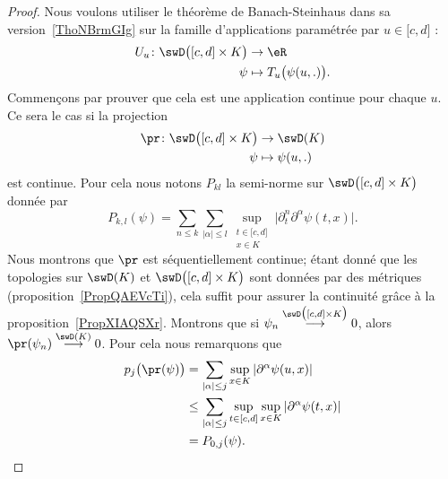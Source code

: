 \begin{proof}
    Nous voulons utiliser le théorème de Banach-Steinhaus dans sa version~\ref{ThoNBrmGIg} sur la famille d'applications paramétrée par \( u\in\mathopen[ c , d \mathclose]\) :
    \begin{equation}        \label{EqBEKoqMb}
        \begin{aligned}
            U_u\colon \swD\big( \mathopen[ c , d \mathclose]\times K \big)&\to \eR \\
            \psi&\mapsto T_u\big( \psi(u,.) \big).
        \end{aligned}
    \end{equation}
    Commençons par prouver que cela est une application continue pour chaque \( u\). Ce sera le cas si la projection
    \begin{equation}
        \begin{aligned}
            \pr\colon \swD\big( \mathopen[ c , d \mathclose]\times K \big)&\to \swD(K) \\
            \psi&\mapsto \psi(u,.)
        \end{aligned}
    \end{equation}
    est continue. Pour cela nous notons \( P_{kl}\) la semi-norme sur \( \swD\big( \mathopen[ c , d \mathclose]\times K \big)\) donnée par
    \begin{equation}
        P_{k,l}(\psi)=\sum_{n\leq k}\sum_{| \alpha |\leq l}\sup_{\substack{t\in\mathopen[ c , d \mathclose]\\x\in K}}\big| \partial_t^n\partial^{\alpha}\psi(t,x) \big|.
    \end{equation}
    Nous montrons que \( \pr\) est séquentiellement continue; étant donné que les topologies sur \( \swD(K)\) et \( \swD\big( \mathopen[ c , d \mathclose]\times K \big)\) sont données par des métriques (proposition~\ref{PropQAEVcTi}), cela suffit pour assurer la continuité grâce à la proposition~\ref{PropXIAQSXr}. Montrons que si \( \psi_n\stackrel{\swD\big( \mathopen[ c , d \mathclose]\times K \big)}{\longrightarrow}0\), alors \( \pr(\psi_n)\stackrel{\swD(K)}{\longrightarrow}0\). Pour cela nous remarquons que
    \begin{subequations}
        \begin{align}
            p_j\big( \pr(\psi) \big)&=\sum_{| \alpha |\leq j}\sup_{x\in K}| \partial^{\alpha}\psi(u,x) |\\
            &\leq \sum_{| \alpha |\leq j}\sup_{t\in\mathopen[ c , d \mathclose]}\sup_{x\in K}| \partial^{\alpha}\psi(t,x) |\\
            &=P_{0,j}(\psi).

\end{align}
\end{subequations}
\end{proof}
